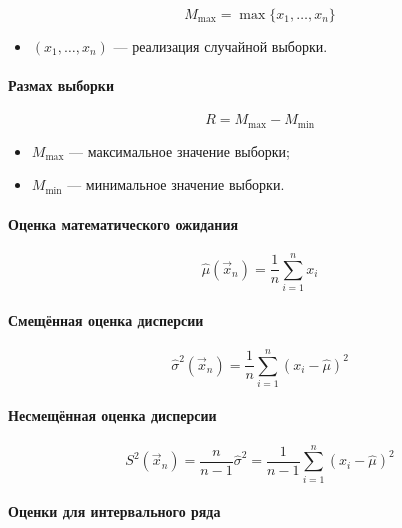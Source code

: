 \documentclass[a4paper,11pt,russian]{extreport}
\begin{document}
	\begin{equation}
	M_{\max} = \max \{ x_1, \dots, x_n\}
	\end{equation}
	\begin{itemize}
		\item $(x_1, \dots, x_n)$ --- реализация случайной выборки.
	\end{itemize}
	
	
	\paragraph{Размах выборки}
	
	\begin{equation}
	R = M_{\max} - M_{\min}
	\end{equation}
	\begin{itemize}
		\item $M_{\max}$ --- максимальное значение выборки;
		\item $M_{\min}$ --- минимальное значение выборки.
	\end{itemize}
	
	
	\paragraph{Оценка математического ожидания}
	
	\begin{equation}
	\hat{\mu}(\vec{x}_n) =\frac{1}{n} \sum_{i = 1}^{n} x_i
	\end{equation}
	
	
	\paragraph{Смещённая оценка дисперсии}
	
	\begin{equation}
	\hat{\sigma}^2(\vec{x}_n) = \frac{1}{n} \sum_{i = 1}^{n}(x_i - \hat{\mu})^2
	\end{equation}
	
	
	\paragraph{Несмещённая оценка дисперсии}
	
	\begin{equation}
	S^2(\vec{x}_n) = \frac{n}{n - 1}\hat{\sigma}^2 = \frac{1}{n - 1}\sum_{i = 1}^{n}(x_i - \hat{\mu})^2
	\end{equation}
	
	\iffalse
	\paragraph{Оценки для интервального ряда}
		
\end{document}
